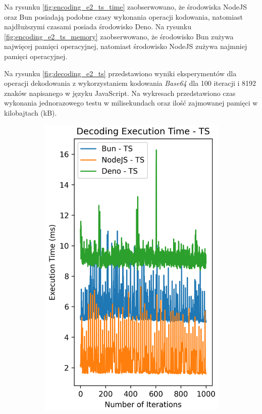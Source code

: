 Na rysunku \ref{fig:encoding_e2_ts_time} zaobserwowano, że środowiska NodeJS oraz Bun posiadają podobne czasy wykonania operacji kodowania, natomiast najdłuższymi czasami posiada środowisko Deno. Na rysunku \ref{fig:encoding_e2_ts_memory} zaobserwowano, że środowisko Bun zużywa najwięcej pamięci operacyjnej, natomiast środowisko NodeJS zużywa najmniej pamięci operacyjnej.

Na rysunku \ref{fig:decoding_e2_ts} przedstawiono wyniki eksperymentów dla operacji dekodowania z wykorzystaniem kodowania \textit{Base64} dla 100 iteracji i 8192 znaków napisanego w języku JavaScript. Na wykresach przedstawiono czas wykonania jednorazowego testu w milisekundach oraz ilość zajmowanej pamięci w kilobajtach (kB).

\begin{figure}[H]
  \centering
  \begin{subfigure}[b]{0.42\textwidth}
    \centering
    \includegraphics[width=\textwidth]{Figures/coding/base64_1000_decoding_ts_time.png}

\end{subfigure}
\end{figure}
